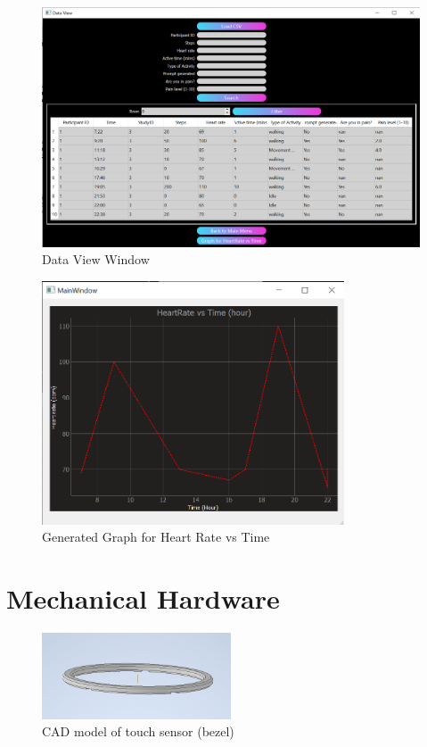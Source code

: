 \documentclass[12pt, titlepage]{article}
\begin{document}
\begin{figure}[H]
	\begin{center}
		 \includegraphics[width=1\textwidth]{DataView}
		\caption{Data View Window}
		\label{DataView} 
	\end{center}
\end{figure}

\begin{figure}[H]
	\begin{center}
		 \includegraphics[width=0.8\textwidth]{Graph}
		\caption{Generated Graph for Heart Rate vs Time}
		\label{Graph} 
	\end{center}
\end{figure}
\section{Mechanical Hardware}
\label{MechHardware}
\begin{figure}[H]
	\begin{center}
		 \includegraphics[width=0.5\textwidth]{BezelCAD}
		\caption{CAD model of touch sensor (bezel)}
		\label{BezelCAD} 
	\end{center}
\end{figure}
\end{document}

